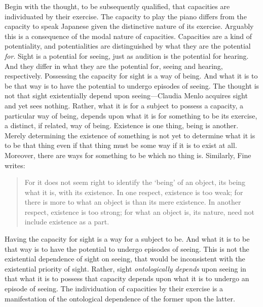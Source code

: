 \documentclass[12pt]{article}
\begin{document}
Begin with the thought, to be subsequently qualified, that capacities are individuated by their exercise. The capacity to play the piano differs from the capacity to speak Japanese given the distinctive nature of its exercise. Arguably this is a consequence of the modal nature of capacities. Capacities are a kind of potentiality, and potentialities are distinguished by what they are the potential \emph{for}. Sight is a potential for seeing, just as audition is the potential for hearing. And they differ in what they are the potential for, seeing and hearing, respectively. Possessing the capacity for sight is a way of being. And what it is to be that way is to have the potential to undergo episodes of seeing. The thought is not that sight existentially depend upon seeing---Claudia Menlo acquires sight and yet sees nothing. Rather, what it is for a subject to possess a capacity, a particular way of being, depends upon what it is for something to be its exercise, a distinct, if related, way of being. Existence is one thing, being is another. Merely determining the existence of something is not yet to determine what it is to be that thing even if that thing must be some way if it is to exist at all. Moreover, there are ways for something to be which no thing is. Similarly, Fine writes:
\begin{quote}
	For it does not seem right to identify the `being' of an object, its being what it is, with its existence. In one respect, existence is too weak; for there is more to what an object is than its mere existence. In another respect, existence is too strong; for what an object is, its nature, need not include existence as a part. \citep[274]{Fine:1995ls}
\end{quote}
Having the capacity for sight is a way for a subject to be. And what it is to be that way is to have the potential to undergo episodes of seeing. This is not the existential dependence of sight on seeing, that would be inconsistent with the existential priority of sight. Rather, sight \emph{ontologically depends} upon seeing in that what it is to possess that capacity depends upon what it is to undergo an episode of seeing. The individuation of capacities by their exercise is a manifestation of the ontological dependence of the former upon the latter.
\end{document}
